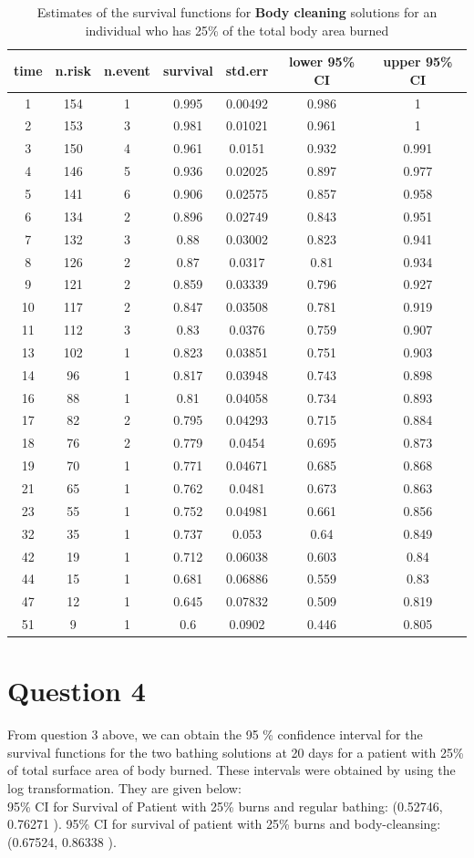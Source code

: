 \documentclass[a4paper, 12pt]{article}
\begin{document}
\begin{table}[!htbp]
\centering
\caption{Estimates of the survival functions for \textbf{Body cleaning} solutions for an individual who has 25\% of the total body area burned} 
\begin{tabular}{ccccccc}
\hline \hline
time&n.risk&n.event&survival&std.err&lower 95\% CI&upper 95\% CI\\
\hline
1&154&1&0.995&0.00492&0.986&1\\
2&153&3&0.981&0.01021&0.961&1\\
3&150&4&0.961&0.0151&0.932&0.991\\
4&146&5&0.936&0.02025&0.897&0.977\\
5&141&6&0.906&0.02575&0.857&0.958\\
6&134&2&0.896&0.02749&0.843&0.951\\
7&132&3&0.88&0.03002&0.823&0.941\\
8&126&2&0.87&0.0317&0.81&0.934\\
9&121&2&0.859&0.03339&0.796&0.927\\
10&117&2&0.847&0.03508&0.781&0.919\\
11&112&3&0.83&0.0376&0.759&0.907\\
13&102&1&0.823&0.03851&0.751&0.903\\
14&96&1&0.817&0.03948&0.743&0.898\\
16&88&1&0.81&0.04058&0.734&0.893\\
17&82&2&0.795&0.04293&0.715&0.884\\
18&76&2&0.779&0.0454&0.695&0.873\\
19&70&1&0.771&0.04671&0.685&0.868\\
21&65&1&0.762&0.0481&0.673&0.863\\
23&55&1&0.752&0.04981&0.661&0.856\\
32&35&1&0.737&0.053&0.64&0.849\\
42&19&1&0.712&0.06038&0.603&0.84\\
44&15&1&0.681&0.06886&0.559&0.83\\
47&12&1&0.645&0.07832&0.509&0.819\\
51&9&1&0.6&0.0902&0.446&0.805\\		
\hline \hline
\end{tabular}
\end{table}
\pagebreak

\section*{Question 4}
From question 3 above, we can obtain the 95 \% confidence interval for the survival functions for the two bathing solutions
at 20 days for a patient with 25\% of total surface area of body burned. These intervals were obtained by using the log transformation. They are given below:\\
95\% CI for Survival of Patient with 25\% burns and regular bathing: (0.52746, 0.76271 ).
95\% CI for survival of patient with 25\% burns and body-cleansing: (0.67524, 0.86338 ). 
\end{document}
